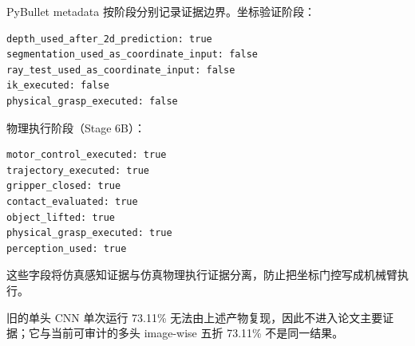 \documentclass{l4proj}
\begin{document}
\begin{appendices}
PyBullet metadata 按阶段分别记录证据边界。坐标验证阶段：
\begin{lstlisting}
depth_used_after_2d_prediction: true
segmentation_used_as_coordinate_input: false
ray_test_used_as_coordinate_input: false
ik_executed: false
physical_grasp_executed: false
\end{lstlisting}
物理执行阶段（Stage 6B）：
\begin{lstlisting}
motor_control_executed: true
trajectory_executed: true
gripper_closed: true
contact_evaluated: true
object_lifted: true
physical_grasp_executed: true
perception_used: true
\end{lstlisting}
这些字段将仿真感知证据与仿真物理执行证据分离，防止把坐标门控写成机械臂执行。

旧的单头 CNN 单次运行 73.11\% 无法由上述产物复现，因此不进入论文主要证据；它与当前可审计的多头 image-wise 五折 73.11\% 不是同一结果。

\end{appendices}


\renewcommand{\thechapter}{0}

\end{document}
